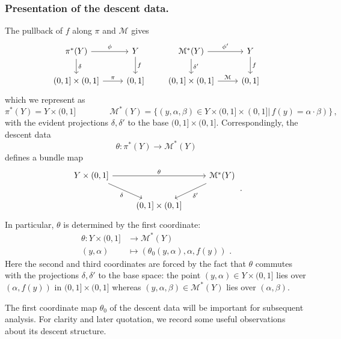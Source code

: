 \documentclass[a4paper, 11pt,reqno]{amsart}
\newcommand{\M}{\mathcal{M}}
\begin{document}
\subsubsection*{Presentation of the descent data.} The pullback of $f$ along $\pi$ and $\M$ gives
\[\begin{tikzcd} \pi^*(Y) \ar[r,"\phi"] \ar[d,"\delta"] & Y \ar[d,"f"]\\
(0,1]\times (0,1] \ar[r, "\pi"] & (0,1]
\end{tikzcd}\quad\quad \begin{tikzcd} \M^*(Y) \ar[r,"\phi'"] \ar[d,"\delta'"] & Y \ar[d,"f "]\\
(0,1]\times (0,1] \ar[r, "\M"] & (0,1]
\end{tikzcd}\]
which we represent as
\[\pi^*(Y)= Y\times (0,1]\qquad\qquad \M^*(Y)=\{(y,\alpha,\beta) \in Y\times (0,1]\times (0,1]\big|\, f(y)=\alpha\cdot  \beta)\}\,,\]
with the evident projections $\delta,\delta'$ to the base $(0,1]\times (0,1]$. %
Correspondingly, the descent data $$\theta\colon \pi^*(Y)\rightarrow\M^*(Y)$$ defines a bundle map 
\begin{equation*} %
\begin{tikzcd} Y\times (0,1] \ar[rr,"\theta"] \ar[dr,swap, "\delta"] && \M^*(Y) \ar[dl,"\delta'"]\\
& (0,1]\times(0,1]
\end{tikzcd}\,.
\end{equation*}
In particular, $\theta$ is determined by the first coordinate: 
\begin{align}\label{eq:theta-coordinate}
\theta\colon Y\times (0,1] &\longrightarrow \M^*(Y)\\
(y,\alpha)&\longmapsto (\theta_0(y,\alpha),\alpha,f(y)) \,\,.\nonumber 
\end{align}
Here the second and third coordinates are forced by the fact that $\theta$ commutes with the projections $\delta,\delta'$ to the base space: the point $(y,\alpha)\in Y\times (0,1]$ lies over $(\alpha,f(y))$ in $(0,1]\times (0,1]$  whereas $(y,\alpha,\beta)\in\M^*(Y)$ lies over $(\alpha, \beta)$. 
\smallskip

The first coordinate map $\theta_0$ of the descent data will be important for subsequent analysis. For clarity and later quotation, we record some useful observations about its descent structure. 
 
\end{document}
